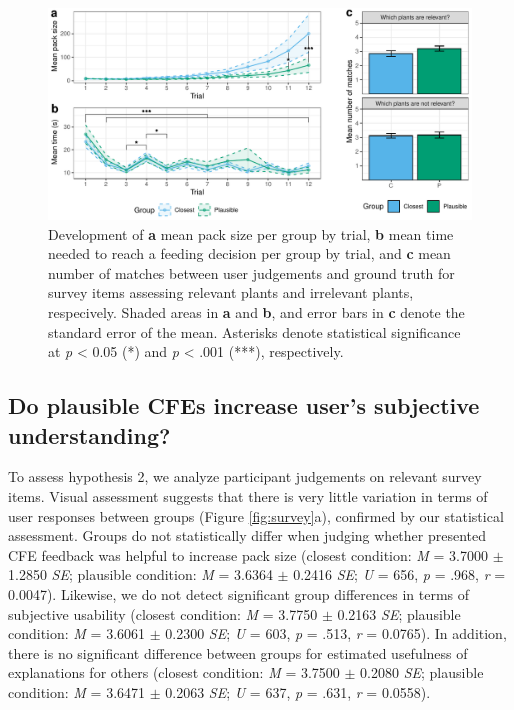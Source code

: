 \begin{figure}
   \centering
   \includegraphics[width=\textwidth]{./media/H1_p_ShubsPerTrial_RTPertrial_PAZ_FINAL.pdf}
   \caption{Development of \textbf{a} mean pack size per group by trial, \textbf{b} mean time needed to reach a feeding decision per group by trial, and \textbf{c} mean number of matches between user judgements and ground truth for survey items assessing relevant plants and irrelevant plants, respecively. Shaded areas in \textbf{a} and \textbf{b}, and error bars in \textbf{c} denote the standard error of the mean. Asterisks denote statistical significance at \textit{p} < 0.05 (*) and \textit{p} < .001 (***), respectively.}
   \label{fig:hyp1}
 \end{figure}

\subsection{Do plausible CFEs increase user's subjective understanding?}
To assess hypothesis 2, we analyze participant judgements on relevant survey items.
Visual assessment suggests that there is very little variation in terms of user responses between groups (Figure \ref{fig:survey}a), confirmed by our statistical assessment. 
Groups do not statistically differ when judging whether presented \gls{CFE} feedback was helpful to increase pack size (closest condition: \textit{M} = 3.7000 $\pm$ 1.2850 \textit{SE}; plausible condition: \textit{M} = 3.6364 $\pm$ 0.2416 \textit{SE}; \textit{U} = 656, \textit{p} = .968, \textit{r} = 0.0047).
Likewise, we do not detect significant group differences in terms of subjective usability (closest condition: \textit{M} = 3.7750 $\pm$ 0.2163 \textit{SE}; plausible condition: \textit{M} = 3.6061 $\pm$ 0.2300 \textit{SE}; \textit{U} = 603, \textit{p} = .513, \textit{r} = 0.0765).
In addition, there is no significant difference between groups for estimated usefulness of explanations for others (closest condition: \textit{M} = 3.7500 $\pm$ 0.2080 \textit{SE}; plausible condition: \textit{M} = 3.6471 $\pm$ 0.2063 \textit{SE}; \textit{U} = 637, \textit{p} = .631, \textit{r} = 0.0558).

